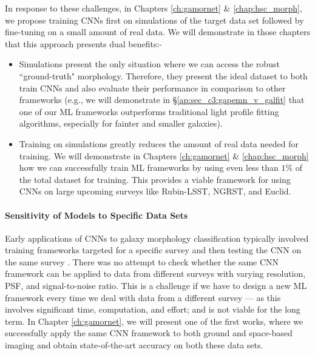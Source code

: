 In response to these challenges, in Chapters \ref{ch:gamornet} \& \ref{chap:hsc_morph}, we propose training CNNs first on simulations of the target data set followed by fine-tuning on a small amount of real data. We will demonstrate in those chapters that this approach presents dual benefits:- 
\begin{itemize}
    \item Simulations present the only situation where we can access the robust ``ground-truth" morphology. Therefore, they present the ideal dataset to both train CNNs and also evaluate their performance in comparison to other frameworks (e.g., we will demonstrate in \S \ref{ap:sec_c3:gapemn_v_galfit} that one of our ML frameworks outperforms traditional light profile fitting algorithms, especially for fainter and smaller galaxies).
    \item Training on simulations greatly reduces the amount of real data needed for training. We will demonstrate in Chapters \ref{ch:gamornet} \& \ref{chap:hsc_morph} how we can successfully train ML frameworks by using even less than $1\%$ of the total dataset for training. This provides a viable framework for using CNNs on large upcoming surveys like Rubin-LSST, NGRST, and Euclid.
\end{itemize}


\paragraph{Sensitivity of Models to Specific Data Sets} Early applications of CNNs to galaxy morphology classification typically involved training frameworks  targeted for a specific survey and then testing the CNN on the same survey \citep[e.g.,]{Dieleman2015Rotation-invariantPrediction, Huertas-Company2015ALEARNING, Tuccillo2018DeepFitting}. There was no attempt to check whether the same CNN framework can be applied to data from different surveys with varying resolution, PSF, and signal-to-noise ratio. This is a challenge if we have to design a new ML framework every time we deal with data from a different survey --- as this involves significant time, computation, and effort; and is not viable for the long term. In Chapter \ref{ch:gamornet}, we will present one of the first works, where we successfully apply the same CNN framework to both ground and space-based imaging and obtain state-of-the-art accuracy on both these data sets. 

